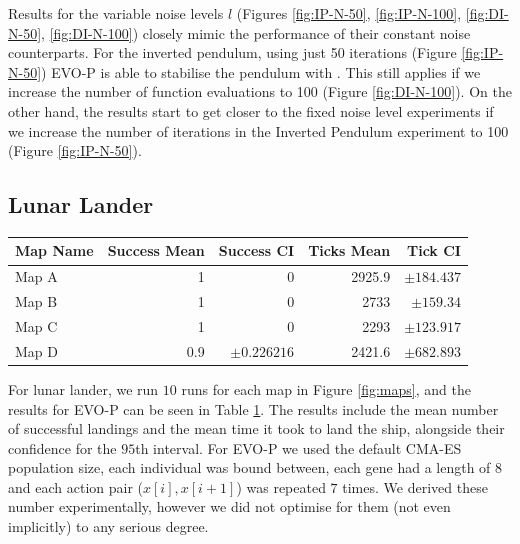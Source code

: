 \documentclass[conference]{IEEEtran}
\begin{document}
Results for the variable noise levels $l$ (Figures \ref{fig:IP-N-50}, \ref{fig:IP-N-100}, \ref{fig:DI-N-50}, \ref{fig:DI-N-100}) closely mimic the performance of their constant noise counterparts. For the inverted pendulum, using just 50 iterations (Figure \ref{fig:IP-N-50}) EVO-P is able to stabilise the pendulum with . This still applies if we increase the number of function evaluations to 100 (Figure \ref{fig:DI-N-100}). On the other hand, the results start to get closer to the fixed noise level experiments if we increase the number of iterations in the Inverted Pendulum experiment to 100 (Figure \ref{fig:IP-N-50}).

\subsection{Lunar Lander}

\begin{table}[h]
	\begin{tabular}{lrrrr}
\hline
 Map Name   &   Success Mean &   Success CI &   Ticks Mean &   Tick CI \\
\hline
 Map A       &            1   &     0        &       2925.9 &   $\pm 184.437$ \\
 Map B  &            1   &     0        &       2733   &   $\pm 159.34$  \\
 Map C  &            1   &     0        &       2293   &   $\pm 123.917$ \\
 Map D  &            0.9 &     $\pm 0.226216$ &       2421.6 &   $\pm 682.893$ \\
\hline
\end{tabular}
\label{tb:results}
\end{table}


For lunar lander, we run $10$ runs for each map in Figure \ref{fig:maps}, and the results for EVO-P can be seen in Table \ref{tb:results}. The results include the mean number of successful landings and the mean time it took to land the ship, alongside their confidence for the $95$th interval.   For EVO-P we used the default CMA-ES population size, each individual was bound between, each gene had a length of $8$ and each action pair ($x[i], x[i+1]$) was repeated $7$ times. We derived these number experimentally, however we did not optimise for them (not even implicitly) to any serious degree.  
\end{document}

